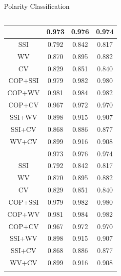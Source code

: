 \documentclass[compress]{beamer}
\begin{document}
\begin{frame}{Polarity Classification}
\begin{columns}
\begin{column}[T]{.6\textwidth}
\begin{table}
\begin{tabular}{cccc}
{                    }
                    \only<2>{
                        COP        & 0.973  & 0.976  & \cellcolor{green}0.974      \\ \hline
                        SSI        & 0.792  & 0.842  & 0.817      \\ \hline
                        WV         & 0.870  & 0.895  & 0.882      \\ \hline
                        CV         & 0.829  & 0.851  & 0.840      \\ \hline
                        COP+SSI    & 0.979  & 0.982  & \cellcolor{red}0.980      \\ \hline
                        COP+WV     & 0.981  & 0.984  & \cellcolor{red}0.982      \\ \hline
                        COP+CV     & 0.967  & 0.972  & 0.970      \\ \hline
                        SSI+WV     & 0.898  & 0.915  & 0.907      \\ \hline
                        SSI+CV     & 0.868  & 0.886  & 0.877      \\ \hline
                        WV+CV      & 0.899  & 0.916  & 0.908      \\ \hline
                    }
                    \only<3>{
                        COP        & 0.973  & 0.976  & 0.974      \\ \hline
                        SSI        & 0.792  & 0.842  & \cellcolor{green}0.817      \\ \hline
                        WV         & 0.870  & 0.895  & \cellcolor{green}0.882      \\ \hline
                        CV         & 0.829  & 0.851  & 0.840      \\ \hline
                        COP+SSI    & 0.979  & 0.982  & 0.980      \\ \hline
                        COP+WV     & 0.981  & 0.984  & 0.982      \\ \hline
                        COP+CV     & 0.967  & 0.972  & 0.970      \\ \hline
                        SSI+WV     & 0.898  & 0.915  & \cellcolor{red}0.907      \\ \hline
                        SSI+CV     & 0.868  & 0.886  & 0.877      \\ \hline
                        WV+CV      & 0.899  & 0.916  & 0.908      \\ \hline
                    }
                    \end{tabular}
                    \end{table}
                \end{column}
            \end{columns}
        \end{frame}
\end{document}
